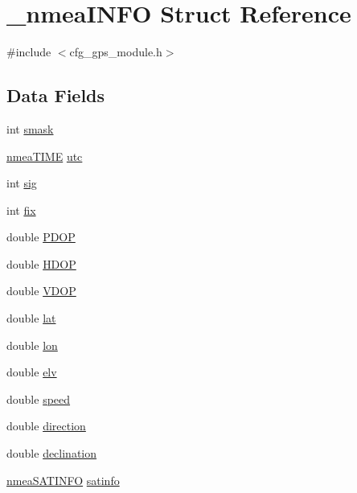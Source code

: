 \hypertarget{struct__nmea_i_n_f_o}{}\section{\+\_\+nmea\+I\+N\+FO Struct Reference}
\label{struct__nmea_i_n_f_o}


{\ttfamily \#include $<$cfg\+\_\+gps\+\_\+module.\+h$>$}

\subsection*{Data Fields}
\begin{DoxyCompactItemize}
\item 
int \hyperlink{struct__nmea_i_n_f_o_a0b5d7bca329dcc3636c4e041c341ac24}{smask}
\item 
\hyperlink{cfg__gps__module_8h_a02bf9ae5b3df2ced0b3406a214735cb2}{nmea\+T\+I\+ME} \hyperlink{struct__nmea_i_n_f_o_a3ddf15855460a4cadc548d695ca841dd}{utc}
\item 
int \hyperlink{struct__nmea_i_n_f_o_a68be1f65e6d1f2949835d9b6b44bcf8e}{sig}
\item 
int \hyperlink{struct__nmea_i_n_f_o_a0e4ac2c68887146d35b9d396ec9e051c}{fix}
\item 
double \hyperlink{struct__nmea_i_n_f_o_afe428212308e86342448d8a749f9c479}{P\+D\+OP}
\item 
double \hyperlink{struct__nmea_i_n_f_o_a249042a406ff0ce3224c19ce667e5be6}{H\+D\+OP}
\item 
double \hyperlink{struct__nmea_i_n_f_o_aa63791741ca31a6f80069a2e8a718dd4}{V\+D\+OP}
\item 
double \hyperlink{struct__nmea_i_n_f_o_a7972334534f68166121a6e51b0aac2d6}{lat}
\item 
double \hyperlink{struct__nmea_i_n_f_o_aa96391e04b5977c50b96d77bea86a01d}{lon}
\item 
double \hyperlink{struct__nmea_i_n_f_o_a0084f233551c00d3b369b7df69524e4f}{elv}
\item 
double \hyperlink{struct__nmea_i_n_f_o_a6dc6e6f3c75c509ce943163afb5dade7}{speed}
\item 
double \hyperlink{struct__nmea_i_n_f_o_a8da9718bd3d0396135453cbb12751a5b}{direction}
\item 
double \hyperlink{struct__nmea_i_n_f_o_a97780ae452ef3641542664e9f353a505}{declination}
\item 
\hyperlink{cfg__gps__module_8h_ae8abd5b6dfff0282bd633dbaac1343ec}{nmea\+S\+A\+T\+I\+N\+FO} \hyperlink{struct__nmea_i_n_f_o_a8a968bcc8b9f6e6cc691a1f593c86792}{satinfo}
\end{DoxyCompactItemize}


